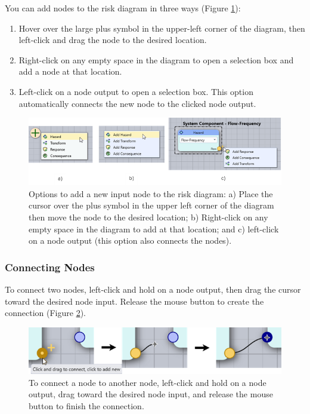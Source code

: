 \documentclass[
]{book}
\begin{document}
You can add nodes to the risk diagram in three ways (Figure \ref{fig:figure-133}):

\begin{enumerate}
\def\labelenumi{\arabic{enumi}.}
\item
  Hover over the large plus symbol in the upper-left corner of the diagram, then left-click and drag the node to the desired location.
\item
  Right-click on any empty space in the diagram to open a selection box and add a node at that location.
\item
  Left-click on a node output to open a selection box. This option automatically connects the new node to the clicked node output.
\end{enumerate}

\begin{figure}

{\centering \includegraphics[width=0.9\linewidth]{images/figure133} 

}

\caption{Options to add a new input node to the risk diagram: a) Place the cursor over the plus symbol in the upper left corner of the diagram then move the node to the desired location; b) Right-click on any empty space in the diagram to add at that location; and c) left-click on a node output (this option also connects the nodes).}\label{fig:figure-133}
\end{figure}

\hypertarget{connecting-nodes}{%
\subsubsection*{Connecting Nodes}\label{connecting-nodes}}

To connect two nodes, left-click and hold on a node output, then drag the cursor toward the desired node input. Release the mouse button to create the connection (Figure \ref{fig:figure-134}).

\begin{figure}

{\centering \includegraphics{images/figure134} 

}

\caption{To connect a node to another node, left-click and hold on a node output, drag toward the desired node input, and release the mouse button to finish the connection.}\label{fig:figure-134}
\end{figure}
\end{document}
